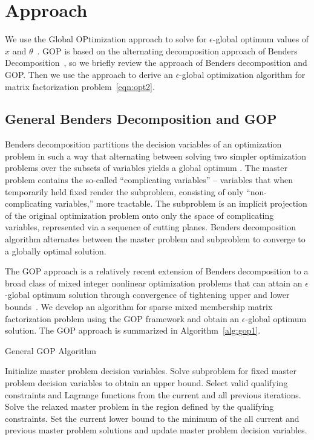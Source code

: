 \documentclass{article} %
\begin{document}
\section{Approach}\label{sec:approach}
We use the Global OPtimization approach to solve for $\epsilon$-global optimum
values of $x$ and $\theta$~\cite{Floudas1990,Floudas1994}. GOP is based on the
alternating decomposition approach of Benders
Decomposition~\cite{Geoffrion1972}, so we briefly review the approach of
Benders decomposition and GOP. Then we use the approach to derive an
$\epsilon$-global optimization algorithm for matrix factorization
problem~\eqref{eqn:opt2}.



\subsection{General Benders Decomposition and GOP}\label{sec:benders}
Benders decomposition partitions the decision variables of an optimization
problem in such a way that alternating between solving two simpler optimization
problems over the subsets of variables yields a global optimum
\cite{Benders1962,Geoffrion1972}. The master problem contains the so-called
``complicating variables'' -- variables that when temporarily held fixed render
the subproblem, consisting of only ``non-complicating variables,'' more
tractable. The subproblem is an implicit projection of the original
optimization problem onto only the space of complicating variables, represented
via a sequence of cutting planes. Benders decomposition algorithm alternates
between the master problem and subproblem to converge to a globally optimal
solution.

The GOP approach is a relatively recent extension of
Benders decomposition to a broad class of mixed integer nonlinear optimization
problems that can attain an $\epsilon$-global optimum solution through
convergence of tightening upper and lower bounds~\cite{Floudas1990}. We develop
an algorithm for sparse mixed membership matrix factorization problem using the
GOP framework and obtain an $\epsilon$-global optimum solution. The GOP
approach is summarized in Algorithm~\ref{alg:gop1}.


\begin{algorithm}[h]
\caption{General GOP Algorithm}
\label{alg:gop1}

\begin{algorithmic}[1]
\STATE Initialize master problem decision variables.
\REPEAT
\STATE Solve subproblem for fixed master problem decision variables to obtain an upper bound.
\STATE Select valid qualifying constraints and Lagrange functions from the current and all previous iterations.
\STATE Solve the relaxed master problem in the region defined by the qualifying constraints.
\ENDFOR
\STATE Set the current lower bound to the minimum of the all current and previous master problem solutions and update master problem decision variables.
\end{algorithmic}

\end{algorithm}
\end{document}
